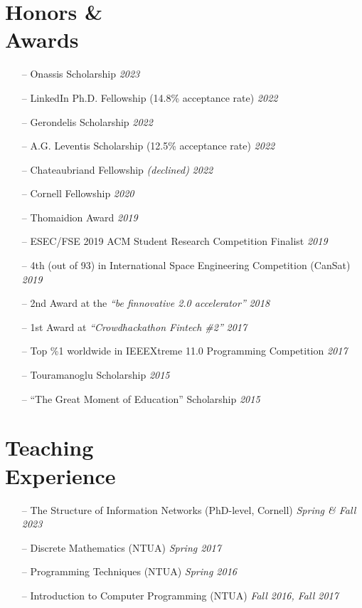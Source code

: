 \documentclass[margin]{res}
\begin{document}
\begin{resume}
\section{Honors \& \\ Awards} 
\begin{itemize}[nosep]
	\item[--] Onassis Scholarship \hfill \emph{2023}
	\item[--] LinkedIn Ph.D. Fellowship (14.8\% acceptance rate) \hfill \emph{2022} 	
	\item[--] Gerondelis Scholarship \hfill \emph{2022}
	\item[--] A.G. Leventis Scholarship (12.5\% acceptance rate) \hfill \emph{2022}
	\item[--] Chateaubriand Fellowship \emph{(declined)} \hfill \emph{2022}
	\item[--] Cornell Fellowship \hfill \emph{2020}
	\item[--] Thomaidion Award \hfill \emph{2019}
	\item[--] ESEC/FSE 2019 ACM Student Research Competition Finalist \hfill \emph{2019}

	\item[--] 4th (out of 93) in International Space Engineering  Competition (CanSat) \hfill \emph{2019}
    \item[--] 2nd Award at the \emph{``be finnovative 2.0 accelerator''} \hfill \emph{2018}
   	\item[--] 1st Award at \emph{``Crowdhackathon Fintech \#2''} \hfill \emph{2017}
   	\item[--] Top \%1 worldwide in IEEEXtreme 11.0 Programming Competition \hfill \emph{2017}
    \item [--] Touramanoglu Scholarship \hfill \emph{2015}
    \item [--] ``The Great Moment of Education'' Scholarship \hfill \emph{2015}

\end{itemize}

\section{Teaching \\ Experience} 
\begin{itemize}[nosep]
	\item[--] The Structure of Information Networks (PhD-level, Cornell) \hfill \emph{Spring \& Fall 2023} 
    \item[--] Discrete Mathematics (NTUA) \hfill \emph{Spring 2017}
    \item[--] Programming Techniques (NTUA) \hfill \emph{Spring 2016}
    \item[--] Introduction to Computer Programming (NTUA) \hfill \emph{Fall 2016, Fall 2017}
\end{itemize}



\end{resume}
\end{document}
